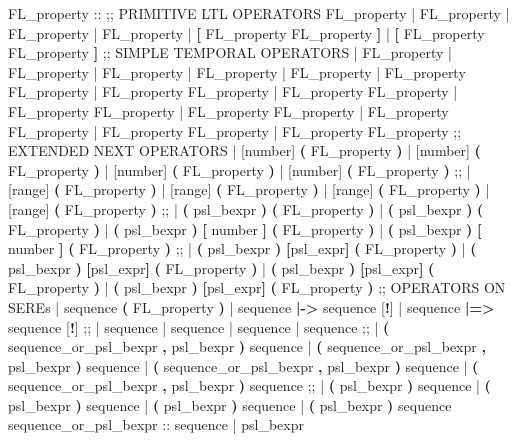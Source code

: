\begin{Grammar}
FL_property ::
 ;; PRIMITIVE LTL OPERATORS
    FL_property
 |  FL_property
 |  FL_property
 |  FL_property
 | \textbf{[} FL_property  FL_property \textbf{]}
 | \textbf{[} FL_property  FL_property \textbf{]}
 ;; SIMPLE TEMPORAL OPERATORS
 |  FL_property
 |  FL_property
 |  FL_property
 |  FL_property
 |  FL_property
 | FL_property  FL_property
 | FL_property  FL_property
 | FL_property  FL_property
 | FL_property  FL_property
 | FL_property  FL_property
 | FL_property  FL_property
 | FL_property  FL_property
 | FL_property  FL_property
 ;; EXTENDED NEXT OPERATORS
 |  [number] \textbf{(} FL_property \textbf{)}
 |  [number] \textbf{(} FL_property \textbf{)}
 |  [number] \textbf{(} FL_property \textbf{)}
 |  [number] \textbf{(} FL_property \textbf{)}
 ;;
 |  [range] \textbf{(} FL_property \textbf{)}
 |  [range] \textbf{(} FL_property \textbf{)}
 |  [range] \textbf{(} FL_property \textbf{)}
 |  [range] \textbf{(} FL_property \textbf{)}
 ;;
 |  \textbf{(} psl_bexpr \textbf{)} \textbf{(} FL_property \textbf{)}
 |  \textbf{(} psl_bexpr \textbf{)} \textbf{(} FL_property \textbf{)}
 |  \textbf{(} psl_bexpr \textbf{)} \textbf{[} number \textbf{]}  \textbf{(} FL_property \textbf{)}
 |  \textbf{(} psl_bexpr \textbf{)} \textbf{[} number \textbf{]}  \textbf{(} FL_property \textbf{)}
 ;;
 |  \textbf{(} psl_bexpr \textbf{)} \textbf{[}psl_expr\textbf{]}  \textbf{(} FL_property \textbf{)}
 |  \textbf{(} psl_bexpr \textbf{)} \textbf{[}psl_expr\textbf{]}  \textbf{(} FL_property \textbf{)}
 |  \textbf{(} psl_bexpr \textbf{)} \textbf{[}psl_expr\textbf{]}  \textbf{(} FL_property \textbf{)}
 |  \textbf{(} psl_bexpr \textbf{)} \textbf{[}psl_expr\textbf{]}  \textbf{(} FL_property \textbf{)}
 ;; OPERATORS ON SEREs
 | sequence \textbf{(} FL_property \textbf{)}
 | sequence \textbf{|->} sequence [\textbf{!}]
 | sequence \textbf{|=>} sequence [\textbf{!}]
 ;;
 |  sequence
 |  sequence
 |  sequence
 |  sequence
 ;;
 |  \textbf{(} sequence_or_psl_bexpr \textbf{,} psl_bexpr \textbf{)} sequence
 |  \textbf{(} sequence_or_psl_bexpr \textbf{,} psl_bexpr \textbf{)} sequence
 |  \textbf{(} sequence_or_psl_bexpr \textbf{,} psl_bexpr \textbf{)} sequence
 |  \textbf{(} sequence_or_psl_bexpr \textbf{,} psl_bexpr \textbf{)} sequence
 ;;
 |  \textbf{(} psl_bexpr \textbf{)} sequence
 |  \textbf{(} psl_bexpr \textbf{)} sequence
 |  \textbf{(} psl_bexpr \textbf{)} sequence
 |  \textbf{(} psl_bexpr \textbf{)} sequence
sequence_or_psl_bexpr ::
   sequence
 | psl_bexpr
\end{Grammar}
